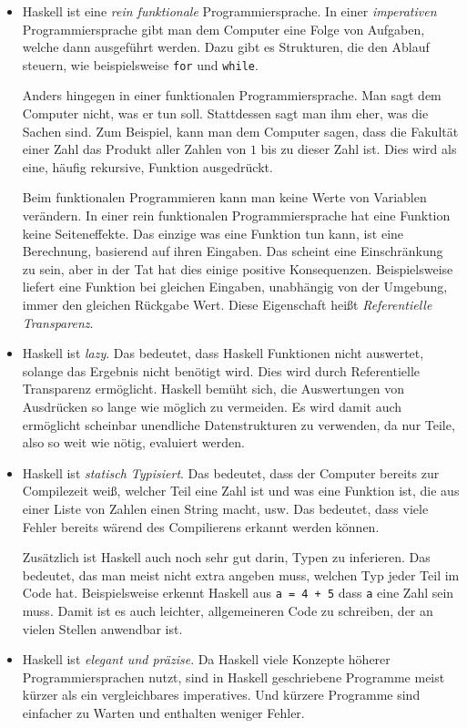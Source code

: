 \begin{itemize}
  \item
Haskell ist eine \emph{rein funktionale} Programmiersprache.
In einer \emph{imperativen} Programmiersprache gibt man dem Computer eine Folge
von Aufgaben, welche dann ausgeführt werden.  Dazu gibt es Strukturen, die den
Ablauf steuern, wie beispielsweise \texttt{for} und \texttt{while}.

Anders hingegen in einer funktionalen Programmiersprache. Man sagt dem Computer
nicht, was er tun soll. Stattdessen sagt man ihm eher, was die Sachen sind.
Zum Beispiel, kann man dem Computer sagen, dass die Fakultät einer Zahl das
Produkt aller Zahlen von $1$ bis zu dieser Zahl ist.
Dies wird als eine, häufig rekursive, Funktion ausgedrückt.

Beim funktionalen Programmieren kann man keine Werte von Variablen verändern.
In einer rein funktionalen Programmiersprache hat eine Funktion keine
Seiteneffekte. Das einzige was eine Funktion tun kann, ist eine Berechnung,
basierend auf ihren Eingaben. Das scheint eine Einschränkung zu sein, aber in
der Tat hat dies einige positive Konsequenzen. Beispielsweise liefert eine
Funktion bei gleichen Eingaben, unabhängig von der Umgebung, immer den gleichen
Rückgabe Wert. Diese Eigenschaft heißt \emph{Referentielle Transparenz}.

  \item
Haskell ist \emph{lazy}.
Das bedeutet, dass Haskell Funktionen nicht auswertet, solange das Ergebnis
nicht benötigt wird. Dies wird durch Referentielle Transparenz ermöglicht.
Haskell bemüht sich, die Auswertungen von Ausdrücken so lange wie möglich zu
vermeiden.
Es wird damit auch ermöglicht scheinbar unendliche Datenstrukturen zu
verwenden, da nur Teile, also so weit wie nötig, evaluiert werden.

  \item
Haskell ist \emph{statisch Typisiert}.
Das bedeutet, dass der Computer bereits zur Compilezeit weiß, welcher Teil eine
Zahl ist und was eine Funktion ist, die aus einer Liste von Zahlen einen String
macht, usw. Das bedeutet, dass viele Fehler bereits wärend des Compilierens
erkannt werden können.

Zusätzlich ist Haskell auch noch sehr gut darin, Typen zu inferieren. Das
bedeutet, das man meist nicht extra angeben muss, welchen Typ jeder Teil im
Code hat. Beispielsweise erkennt Haskell aus \texttt{a = 4 + 5} dass
\texttt{a} eine Zahl sein muss.
Damit ist es auch leichter, allgemeineren Code zu schreiben, der an vielen
Stellen anwendbar ist.

  \item
Haskell ist \emph{elegant und präzise}.
Da Haskell viele Konzepte höherer Programmiersprachen nutzt, sind in Haskell
geschriebene Programme meist kürzer als ein vergleichbares imperatives. Und
kürzere Programme sind einfacher zu Warten und enthalten weniger Fehler.
\end{itemize}

